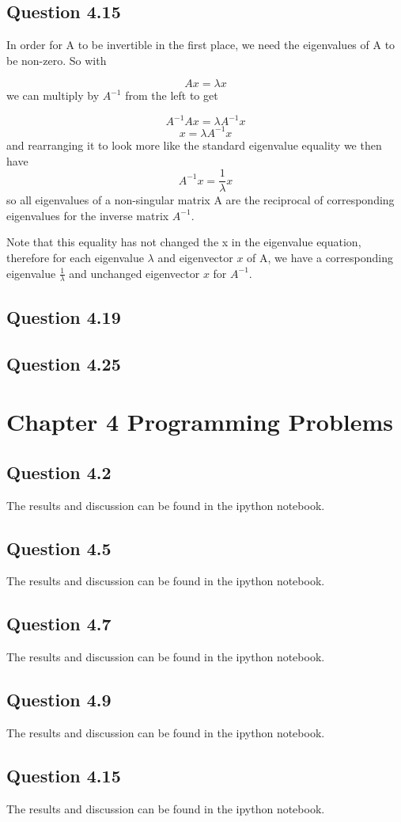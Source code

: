 \documentclass[12pt,a4paper]{report}
\begin{document}
\subsection*{Question 4.15}
In order for A to be invertible in the first place, we need the eigenvalues of A to be
non-zero. So with

$$Ax = \lambda x$$
we can multiply by $A^{-1}$ from the left to get

$$A^{-1}Ax = \lambda A^{-1}x$$
$$x= \lambda A^{-1}x$$
and rearranging it to look more like the standard eigenvalue equality we then have
$$A^{-1}x = \frac{1}{\lambda}x$$
so all eigenvalues of a non-singular matrix A are the reciprocal of corresponding
eigenvalues for the inverse matrix $A^{-1}$.

Note that this equality has not changed the x in the eigenvalue equation,
therefore for each eigenvalue $\lambda$ and eigenvector $x$ of A, we have a corresponding
eigenvalue $\frac{1}{\lambda}$ and unchanged eigenvector $x$ for $A^{-1}$.

\subsection*{Question 4.19}

\subsection*{Question 4.25}


\section*{Chapter 4 Programming Problems}
\subsection*{Question 4.2}
The results and discussion can be found in the ipython notebook.

\subsection*{Question 4.5}
The results and discussion can be found in the ipython notebook.

\subsection*{Question 4.7}
The results and discussion can be found in the ipython notebook.

\subsection*{Question 4.9}
The results and discussion can be found in the ipython notebook.

\subsection*{Question 4.15}
The results and discussion can be found in the ipython notebook.
\end{document}
